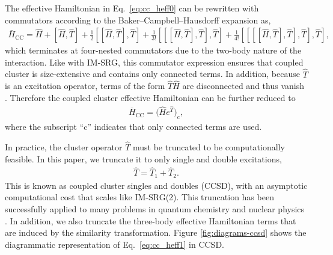 The effective Hamiltonian in Eq.~\eqref{eq:cc_heff0} can be rewritten with commutators according to the Baker--Campbell--Hausdorff expansion as,
\begin{align*}
  \bar{H}_{\mathrm{CC}} = \hat{H} + [\hat{H}, \hat{T}] + \frac{1}{2} [[\hat{H}, \hat{T} ], \hat{T}] + \frac{1}{3!} [[[\hat{H}, \hat{T}], \hat{T}], \hat{T}] + \frac{1}{4!} [[[[\hat{H}, \hat{T}], \hat{T}], \hat{T}], \hat{T}],
\end{align*}
which terminates at four-nested commutators due to the two-body nature of the interaction.  Like with IM-SRG, this commutator expression ensures that coupled cluster is size-extensive and contains only connected terms.  In addition, because $\hat{T}$ is an excitation operator, terms of the form $\hat{T} \hat{H}$ are disconnected and thus vanish \cite{shavitt2009many}.  Therefore the coupled cluster effective Hamiltonian can be further reduced to
\begin{align} \label{eq:cc_heff1}
  \bar{H}_{\mathrm{CC}} = \bigl(\hat{H}e^{\hat{T}}\bigr)_{\mathrm{c}},
\end{align}
where the subscript ``$\mathrm{c}$'' indicates that only connected terms are used.

In practice, the cluster operator $\hat{T}$ must be truncated to be computationally feasible.  In this paper, we truncate it to only single and double excitations,
\begin{align*}
  \hat{T} = \hat{T}_{1} + \hat{T}_{2}.
\end{align*}
This is known as coupled cluster singles and doubles (CCSD), with an
asymptotic computational cost that scales like IM-SRG(2).  This
truncation has been successfully applied to many problems in quantum
chemistry \cite{RevModPhys.79.291} and nuclear
physics \cite{0034-4885-77-9-096302}.  In addition, we also truncate
the three-body effective Hamiltonian terms that are induced by the
similarity transformation.  Figure \ref{fig:diagrams-ccsd} shows the
diagrammatic representation of Eq.~\eqref{eq:cc_heff1} in CCSD.

